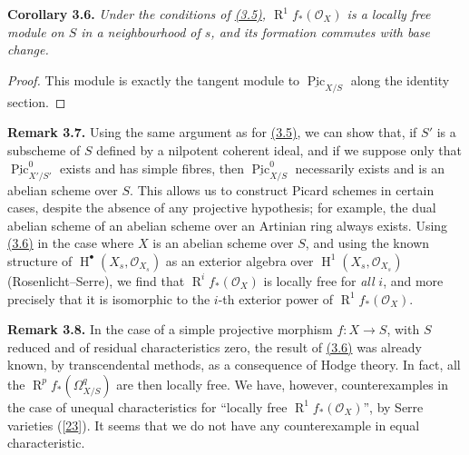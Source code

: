 \documentclass{article}
\newenvironment{itenv}[1]
  {\phantomsection\par\smallskip\noindent\textbf{#1.}\itshape}
  {\par\smallskip}
\newenvironment{rmenv}[1]
  {\phantomsection\par\smallskip\noindent\textbf{#1.}\rmfamily}
  {\par\smallskip}
\newcommand{\oldpage}[1]{\marginpar{\footnotesize$\Big\vert$ \textit{p.~#1}}}
\theoremstyle{definition}
\theoremstyle{definition}
\theoremstyle{definition}
\theoremstyle{definition}
\theoremstyle{remark}
\begin{document}
\leavevmode{}%
\begin{itenv}{Corollary 3.6}
Under the conditions of \protect\hyperlink{fga-3-vi-theorem-3.5}{(3.5)}, \(\operatorname{R}^1 f_*({\mathscr{O}}_X)\) is a locally free module on \(S\) in a neighbourhood of \(s\), and its formation commutes with base change.

\end{itenv}

\begin{proof}
This module is exactly the tangent module to \(\underline{\operatorname{Pic}}_{X/S}\) along the identity section.
\end{proof}

\leavevmode{}%
\begin{rmenv}{Remark 3.7}
Using the same argument as for \protect\hyperlink{fga-3-vi-theorem-3.5}{(3.5)}, we can show that, if \(S'\) is a subscheme of \(S\) defined by a nilpotent coherent ideal, and if we suppose only that \(\underline{\operatorname{Pic}}_{X'/S'}^0\) exists and has simple fibres, then \(\underline{\operatorname{Pic}}_{X/S}^0\) necessarily exists and is an abelian scheme over \(S\).
This allows us to construct Picard schemes in certain cases, despite the absence of any projective hypothesis;
for example, the dual abelian scheme of an abelian scheme over an Artinian ring always exists.
Using \protect\hyperlink{fga-3-vi-corollary-3.6}{(3.6)} in the case where \(X\) is an abelian scheme over \(S\), and using the known structure of \(\operatorname{H}^\bullet(X_s,{\mathscr{O}}_{X_s})\) as an exterior algebra over \(\operatorname{H}^1(X_s,{\mathscr{O}}_{X_s})\) (Rosenlicht--Serre), we find that \(\operatorname{R}^if_*({\mathscr{O}}_X)\) is locally free for \emph{all} \(i\), and more precisely that it is isomorphic to the \(i\)-th exterior power of \(\operatorname{R}^1f_*({\mathscr{O}}_X)\).

\end{rmenv}

\leavevmode{}%
\begin{rmenv}{Remark 3.8}
In the case of a simple projective morphism \(f\colon X\to S\), with \(S\) reduced and of residual characteristics zero, the result of \protect\hyperlink{fga-3-vi-corollary-3.6}{(3.6)} was already known, by transcendental methods, as a consequence of Hodge theory.
In fact, all the \(\operatorname{R}^pf_*(\Omega_{X/S}^q)\) are then locally free.
\oldpage{236-21}We have, however, counterexamples in the case of unequal characteristics for ``locally free \(\operatorname{R}^1f_*({\mathscr{O}}_X)\)'', by Serre varieties ({[}\protect\hyperlink{ref-Ser1958b}{23}{]}).
It seems that we do not have any counterexample in equal characteristic.

\end{rmenv}
\end{document}
